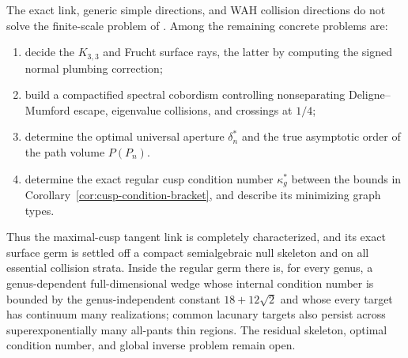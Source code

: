 \documentclass[11pt,reqno]{amsart}
\theoremstyle{definition}
\theoremstyle{remark}
\begin{document}
The exact link, generic simple directions, and WAH collision directions do
not solve the finite-scale problem of \cite[Question~1]{EJT2026}.  Among the
remaining concrete problems are:
\begin{enumerate}[label=\textup{(\arabic*)},leftmargin=2.2em]
\item decide the $K_{3,3}$ and Frucht surface rays, the latter by computing
the signed normal plumbing correction;
\item build a compactified spectral cobordism controlling nonseparating
Deligne--Mumford escape, eigenvalue collisions, and crossings at $1/4$;
\item determine the optimal universal aperture $\delta_n^*$ and the true
asymptotic order of the path volume $P(P_n)$.
\item determine the exact regular cusp condition number $\kappa_g^*$ between
the bounds in Corollary~\ref{cor:cusp-condition-bracket}, and describe its
minimizing graph types.
\end{enumerate}
Thus the maximal-cusp tangent link is completely characterized, and its
exact surface germ is settled off a compact semialgebraic null skeleton and
on all essential collision strata.  Inside the regular germ there is,
for every genus, a genus-dependent full-dimensional wedge whose internal
condition number is bounded by the genus-independent constant
$18+12\sqrt2$ and whose every target has continuum many realizations;
common lacunary targets also persist across
superexponentially many all-pants thin regions.  The residual skeleton,
optimal condition number, and global inverse problem remain open.



\end{document}
